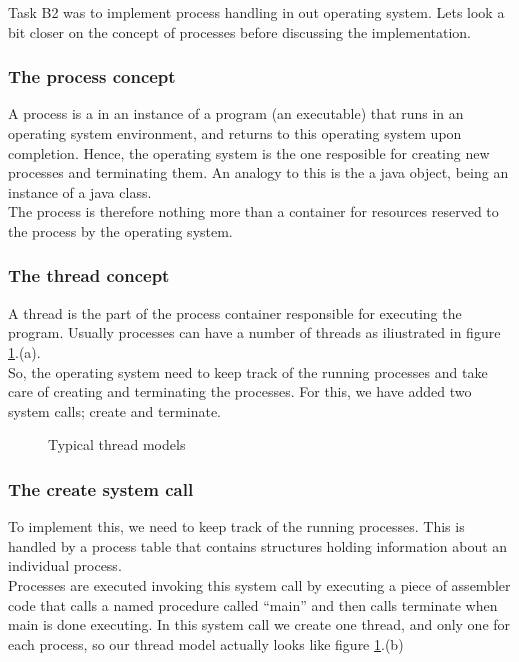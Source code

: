 Task B2 was to implement process handling in out operating system. Lets look a bit closer on the concept of processes before discussing the implementation.
\subsubsection{The process concept}
A process is a in an instance of a program (an executable) that runs in an operating system environment, 
and returns to this operating system upon completion. Hence, the operating system is the one resposible for 
creating new processes and terminating them. An analogy to this is the a java object, being an instance of a java class.\\
The process is therefore nothing more than a container for resources reserved to the process by the operating system. \\

\subsubsection{The thread concept}
A thread is the part of the process container responsible for executing the program. Usually processes can have a number of threads as iliustrated in figure \ref{fig:thread_models}.(a). \\

So, the operating system need to keep track of the running processes and take care of creating and terminating the processes. 
For this, we have added two system calls; create and terminate.

\begin{figure}
\centering
{}
\caption{Typical thread models}
\label{fig:thread_models}
\end{figure}

\subsubsection*{The create system call}
To implement this, we need to keep track of the running processes. This is handled by a process table that contains structures holding information about an individual process. \\
Processes are executed invoking this system call by executing a piece of assembler code that calls a named procedure called ``main'' and then calls terminate when main is done executing. In this system call we create one thread, and only one for each process, so our thread model actually looks like figure \ref{fig:thread_models}.(b)

